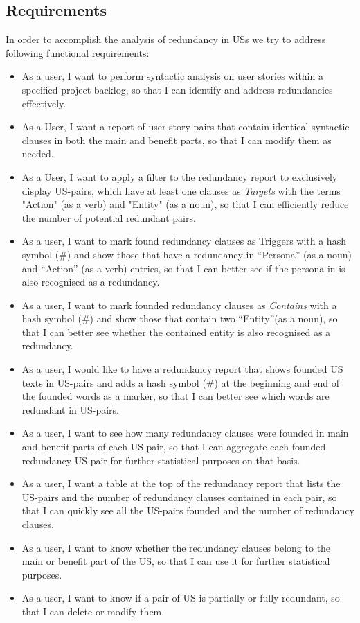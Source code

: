 \subsection{Requirements}\label{redundancy_requirement}
In order to accomplish the analysis of redundancy in USs we try to address following functional requirements:
\begin{itemize}

\item As a user, I want to perform syntactic analysis on user stories within a specified project backlog, so that I can identify and address redundancies effectively.

\item As a User, I want a report of user story pairs that contain identical syntactic clauses in both the main and benefit parts, so that I can modify them as needed.

\item As a User, I want to apply a filter to the redundancy report to exclusively display US-pairs, which have at least one clauses as \textit{Targets} with the terms "Action" (as a verb) and "Entity" (as a noun), so that I can efficiently reduce the number of potential redundant pairs.

\item As a user, I want to mark found redundancy clauses as Triggers with a hash symbol (\#) and show those that have a redundancy in \enquote{Persona} (as a noun) and \enquote{Action} (as a verb) entries, so that I can better see if the persona in is also recognised as a redundancy.

\item As a user, I want to mark founded redundancy clauses as \textit{Contains} with a hash symbol (\#) and show those that contain two \enquote{Entity}(as a noun), so that I can better see whether the contained entity is also recognised as a redundancy.

\item As a user, I would like to have a redundancy report that shows founded US texts in US-pairs and adds a hash symbol (\#) at the beginning and end of the founded words as a marker, so that I can better see which words are redundant in US-pairs.

\item As a user, I want to see how many redundancy clauses were founded in main and benefit parts of each US-pair, so that I can aggregate each founded redundancy US-pair for further statistical purposes on that basis.

\item As a user, I want a table at the top of the redundancy report that lists the US-pairs and the number of redundancy clauses contained in each pair, so that I can quickly see all the US-pairs founded and the number of redundancy clauses.

\item As a user, I want to know whether the redundancy clauses belong to the main or benefit part of the US, so that I can use it for further statistical purposes.

\item As a user, I want to know if a pair of US is partially or fully redundant, so that I can delete or modify them.
\end{itemize}

